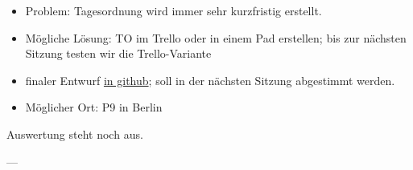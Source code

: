 \begin{Protokoll}
            
    \begin{itemize}
        \item Problem: Tagesordnung wird immer sehr kurzfristig erstellt. 
        \item Mögliche Lösung: TO im Trello oder in einem Pad erstellen; bis zur nächsten Sitzung testen wir die Trello-Variante
    \end{itemize}
    
            
    
    \begin{itemize}
        \item finaler Entwurf \href{https://github.com/JungePiratenDeutschland/Geschaeftsordnung-BV/blob/draft-vs2017_12_20/GO.md}{in github}; soll in der nächsten Sitzung abgestimmt werden.
    \end{itemize}
    
    \begin{itemize}
        \item Möglicher Ort: P9 in Berlin
    \end{itemize}
    
    
    Auswertung steht noch aus.
    
    ---
    
 

\end{Protokoll}
